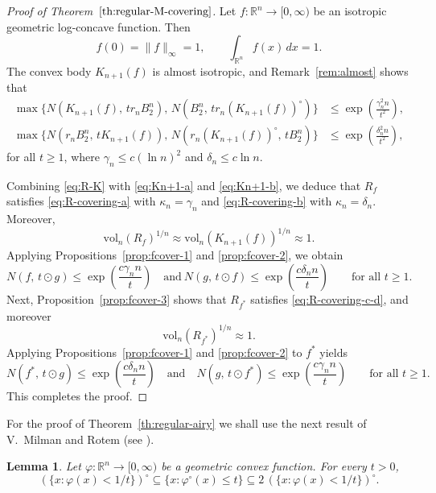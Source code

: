 \documentclass[11pt,leqno]{article}
\newtheorem{lemma}[theorem]{Lemma}
\theoremstyle{definition}
\theoremstyle{remark}
\numberwithin{equation}{section}
\newcommand{\vol}{\mathrm{vol}}
\newcommand{\ls}{\leqslant}
\newcommand{\gr}{\geqslant}
\begin{document}
\begin{proof}[Proof of Theorem~$\ref{th:regular-M-covering}$]
Let $f:\mathbb{R}^n\to[0,\infty)$ be an isotropic geometric log-concave function.  
Then
$$f(0)=\|f\|_{\infty}=1,\qquad\int_{\mathbb{R}^n} f(x)\,dx = 1.$$
The convex body $K_{n+1}(f)$ is almost isotropic, and Remark~\ref{rem:almost} shows that
\begin{align}
\max\!\bigl\{ N(K_{n+1}(f),\, t r_n B_2^n),\,N(B_2^n,\, t r_n (K_{n+1}(f))^{\circ}) \bigr\}
&\ls \exp\!\left( \frac{\gamma_n^2 n}{t^2} \right),
\label{eq:Kn+1-a}
\\[0.3em]
\max\!\bigl\{ N(r_n B_2^n,\, t K_{n+1}(f)),\,N(r_n (K_{n+1}(f))^{\circ},\, t B_2^n) \bigr\}
&\ls \exp\!\left( \frac{\delta_n^2 n}{t^2} \right),
\label{eq:Kn+1-b}
\end{align}
for all $t\gr 1$, where $\gamma_{n} \ls c(\ln n)^{2}$ and $\delta_n\ls c\ln n$.

Combining \eqref{eq:R-K} with \eqref{eq:Kn+1-a} and \eqref{eq:Kn+1-b}, we deduce that  
$R_f$ satisfies \eqref{eq:R-covering-a} with $\kappa_n=\gamma_n$ and \eqref{eq:R-covering-b} with $\kappa_n=\delta_n$.  
Moreover,
$$\vol_n(R_f)^{1/n}\approx \vol_n(K_{n+1}(f))^{1/n}\approx 1.$$
Applying Propositions~\ref{prop:fcover-1} and \ref{prop:fcover-2}, we obtain
$$N(f,\, t\odot g)\ls \exp\!\left(\frac{c\gamma_nn}{t}\right)\quad \text{and} \ N(g,\, t\odot f)
\ls \exp\!\left(\frac{c\delta_n n}{t}\right)
\qquad\text{for all } t\gr 1.$$
Next, Proposition~\ref{prop:fcover-3} shows that $R_{f^{\ast}}$ satisfies  
\eqref{eq:R-covering-c-d}, and moreover
$$\vol_n(R_{f^{\ast}})^{1/n}\approx 1.$$
Applying Propositions~\ref{prop:fcover-1} and \ref{prop:fcover-2} to $f^{\ast}$ yields
$$N(f^{\ast},\, t\odot g)\ls \exp\!\left(\frac{c\delta_n n}{t}\right)\quad \text{and}\quad  N(g,\, t\odot f^{\ast})
\ls \exp\!\left(\frac{c\gamma_n n}{t}\right)
\qquad\text{for all } t\gr 1.$$
This completes the proof.
\end{proof}


For the proof of Theorem~\ref{th:regular-airy} we shall use the next result of V.~Milman and Rotem (see \cite[Proposition~11]{VMilman-Rotem-2013}).

\begin{lemma}\label{lem:rotem-1}Let $\varphi:\mathbb{R}^n\to [0,\infty)$ be a geometric convex function.
For every $t>0$,
$$(\{x:\varphi(x)<1/t\})^{\circ}\subseteq \{x:\varphi^{\circ}(x)\ls t\}
\subseteq 2\,(\{x:\varphi(x)<1/t\})^{\circ}.$$
\end{lemma}
\end{document}
